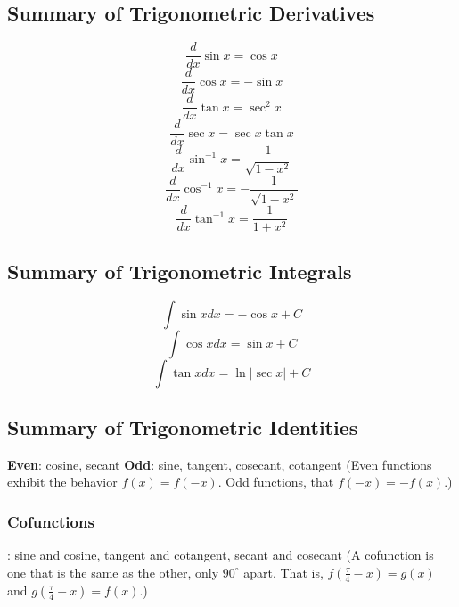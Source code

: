 \subsection{Summary of Trigonometric Derivatives}
\begin{equation}
\frac{d}{dx}\sin{x} = \cos{x}
\end{equation}
\begin{equation}
\frac{d}{dx}\cos{x} = -\sin{x}
\end{equation}
\begin{equation}
\frac{d}{dx}\tan{x} = \sec^2{x}
\end{equation}
\begin{equation}
\frac{d}{dx}\sec{x} = \sec{x}\tan{x}
\end{equation}
\begin{equation}
\frac{d}{dx}\sin^{-1}{x} = \frac{1}{\sqrt{1 - x^2}}
\end{equation}
\begin{equation}
\frac{d}{dx}\cos^{-1}{x} = -\frac{1}{\sqrt{1 - x^2}}
\end{equation}
\begin{equation}
\frac{d}{dx}\tan^{-1}{x} = \frac{1}{1 + x^2}
\end{equation}

\subsection{Summary of Trigonometric Integrals}
\begin{equation}
\int\sin{x}dx = -\cos{x} + C
\end{equation}
\begin{equation}
\int\cos{x}dx = \sin{x} + C
\end{equation}
\begin{equation}
\int\tan{x}dx = \ln{|\sec{x}|} + C
\end{equation}

\subsection{Summary of Trigonometric Identities}
\textbf{Even}: cosine, secant
\textbf{Odd}: sine, tangent, cosecant, cotangent
(Even functions exhibit the behavior $f(x) = f(-x)$.  Odd functions, that $f(-x)=-f(x)$.)

\subsubsection{Cofunctions}: sine and cosine, tangent and cotangent, secant and cosecant
(A cofunction is one that is the same as the other, only $90^\circ$ apart.  That is, 
$f(\frac{\tau}{4}-x) = g(x)$ and $g(\frac{\tau}{4}-x) = f(x)$.)

